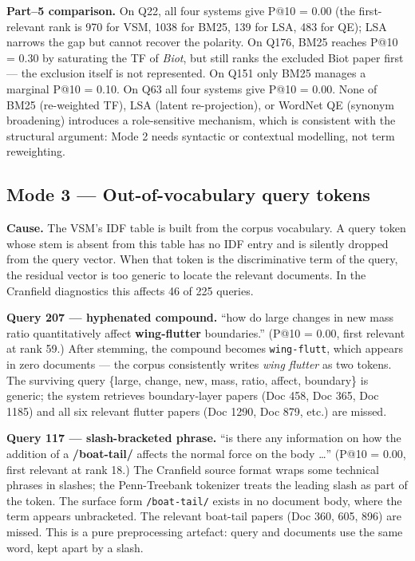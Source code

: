 \documentclass[11pt]{article}
\begin{document}
\textbf{Part--5 comparison.} On Q22, all four systems give P@10 = 0.00 (the
first-relevant rank is 970 for VSM, 1038 for BM25, 139 for LSA, 483 for
QE); LSA narrows the gap but cannot recover the polarity. On Q176, BM25
reaches P@10 = 0.30 by saturating the TF of \emph{Biot}, but still ranks
the excluded Biot paper first --- the exclusion itself is not represented.
On Q151 only BM25 manages a marginal P@10 = 0.10. On Q63 all four systems
give P@10 = 0.00. None of BM25 (re-weighted TF), LSA (latent re-projection),
or WordNet QE (synonym broadening) introduces a role-sensitive mechanism,
which is consistent with the structural argument: Mode 2 needs syntactic
or contextual modelling, not term reweighting.

\subsection{Mode 3 --- Out-of-vocabulary query tokens}

\textbf{Cause.} The VSM's IDF table is built from the corpus vocabulary.
A query token whose stem is absent from this table has no IDF entry and
is silently dropped from the query vector. When that token is the
discriminative term of the query, the residual vector is too generic to
locate the relevant documents. In the Cranfield diagnostics this affects
46 of 225 queries.

\textbf{Query 207 --- hyphenated compound.} ``how do large changes in new
mass ratio quantitatively affect \textbf{wing-flutter} boundaries.''
(P@10 = 0.00, first relevant at rank 59.) After stemming, the compound
becomes \texttt{wing-flutt}, which appears in zero documents --- the corpus
consistently writes \emph{wing flutter} as two tokens. The surviving query
\{large, change, new, mass, ratio, affect, boundary\} is generic; the
system retrieves boundary-layer papers (Doc 458, Doc 365, Doc 1185) and
all six relevant flutter papers (Doc 1290, Doc 879, etc.) are missed.

\textbf{Query 117 --- slash-bracketed phrase.} ``is there any information
on how the addition of a \textbf{/boat-tail/} affects the normal force on
the body \ldots'' (P@10 = 0.00, first relevant at rank 18.) The Cranfield
source format wraps some technical phrases in slashes; the Penn-Treebank
tokenizer treats the leading slash as part of the token. The surface form
\texttt{/boat-tail/} exists in no document body, where the term appears
unbracketed. The relevant boat-tail papers (Doc 360, 605, 896) are missed.
This is a pure preprocessing artefact: query and documents use the same
word, kept apart by a slash.
\end{document}

